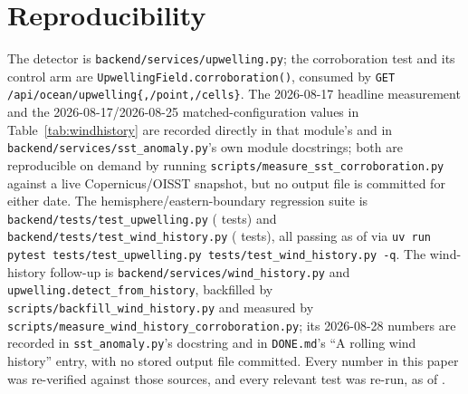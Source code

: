 \documentclass[runningheads]{llncs}
\begin{document}


\section*{Reproducibility}
The detector is \texttt{backend/services/upwelling.py}; the corroboration
test and its control arm are \texttt{UpwellingField.corroboration()},
consumed by \texttt{GET /api/ocean/upwelling\{,/point,/cells\}}. The
2026-08-17 headline measurement and the 2026-08-17/2026-08-25 matched-configuration
values in Table~\ref{tab:windhistory} are recorded directly in that module's
and in \texttt{backend/services/sst\_anomaly.py}'s own module docstrings; both
are reproducible on demand by running \texttt{scripts/measure\_sst\_corroboration.py}
against a live Copernicus/OISST snapshot, but no output file is committed for
either date. The hemisphere/eastern-boundary regression suite is
\texttt{backend/tests/test\_upwelling.py} (\NUpwellingTests{} tests) and
\texttt{backend/tests/test\_wind\_history.py} (\NWindHistoryTests{} tests),
all \NTotalUpwellingTests{} passing as of \AsOf{} via \texttt{uv run pytest
tests/test\_upwelling.py tests/test\_wind\_history.py -q}. The wind-history
follow-up is \texttt{backend/services/wind\_history.py} and
\texttt{upwelling.detect\_from\_history}, backfilled by
\texttt{scripts/backfill\_wind\_history.py} and measured by
\texttt{scripts/measure\_wind\_history\_corroboration.py}; its 2026-08-28
numbers are recorded in \texttt{sst\_anomaly.py}'s docstring and in
\texttt{DONE.md}'s ``A rolling wind history'' entry, with no stored output
file committed. Every number in this paper was re-verified against those
sources, and every relevant test was re-run, as of \AsOf{}.



\end{document}
